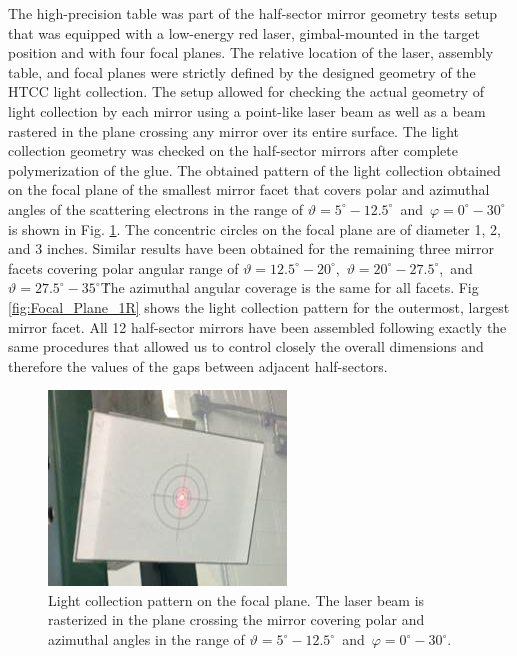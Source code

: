 The high-precision table was part of the half-sector mirror geometry tests setup that was equipped with a low-energy red laser, gimbal-mounted in the target position and with four focal planes. The relative location of the laser, assembly table, and focal planes were strictly defined by the designed geometry of the HTCC light collection. The setup allowed for checking the actual geometry of light collection by each mirror using a point-like laser beam as well as a beam rastered in the plane crossing any mirror over its entire surface. The light collection geometry was checked on the half-sector mirrors after complete polymerization of the glue. The obtained pattern of the light collection obtained on the focal plane of the smallest mirror facet that covers polar and azimuthal angles of the scattering electrons in the range of $\vartheta = 5^\circ - 12.5^\circ$\, and\, $\varphi = 0^\circ - 30^\circ$ is shown in Fig. \ref{fig:Focal_Plane_4}. The concentric circles on the focal plane are of diameter 1, 2, and 3 inches. Similar results have been obtained for the remaining three mirror facets covering polar angular range of $\vartheta = 12.5^\circ - 20^\circ$,\, $\vartheta = 20^\circ - 27.5^\circ$,\, and $\vartheta = 27.5^\circ - 35^\circ$\. The azimuthal angular coverage  is the same for all facets. Fig \ref{fig:Focal_Plane_1R} shows the light collection pattern for the outermost, largest mirror facet. All 12 half-sector mirrors have been assembled following exactly the same procedures that allowed us to control closely the overall dimensions and therefore the values of the gaps between adjacent half-sectors. 

\begin{figure}[ht]
    \centering
    \includegraphics[width=0.90\linewidth]{images/Focal_Plane_4.jpg}
    \caption{Light collection pattern on the focal plane. The laser beam is rasterized in the plane crossing the mirror covering polar and azimuthal angles in the range of $\vartheta = 5^\circ - 12.5^\circ$\, and\, $\varphi = 0^\circ - 30^\circ$.}
    \label{fig:Focal_Plane_4}
\end{figure}

